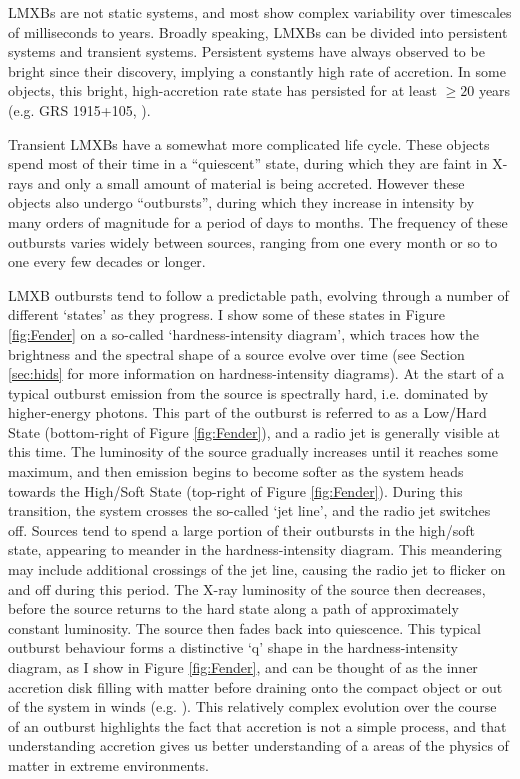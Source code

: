 \par LMXBs are not static systems, and most show complex variability over timescales of milliseconds to years.  Broadly speaking, LMXBs can be divided into persistent systems and transient systems.  Persistent systems have always observed to be bright since their discovery, implying a constantly high rate of accretion.  In some objects, this bright, high-accretion rate state has persisted for at least $\geq20$ years (e.g. GRS 1915+105, \citealp{Deegan_1915}).
\par Transient LMXBs have a somewhat more complicated life cycle.  These objects spend most of their time in a ``quiescent'' state, during which they are faint in X-rays and only a small amount of material is being accreted.  However these objects also undergo ``outbursts'', during which they increase in intensity by many orders of magnitude for a period of days to months.  The frequency of these outbursts varies widely between sources, ranging from one every month or so to one every few decades or longer.
\par LMXB outbursts tend to follow a predictable path, evolving through a number of different `states' as they progress.  I show some of these states in Figure \ref{fig:Fender} on a so-called `hardness-intensity diagram', which traces how the brightness and the spectral shape of a source evolve over time (see Section \ref{sec:hids} for more information on hardness-intensity diagrams).  At the start of a typical outburst emission from the source is spectrally hard, i.e. dominated by higher-energy photons.  This part of the outburst is referred to as a Low/Hard State (bottom-right of Figure \ref{fig:Fender}), and a radio jet is generally visible at this time.  The luminosity of the source gradually increases until it reaches some maximum, and then emission begins to become softer as the system heads towards the High/Soft State (top-right of Figure \ref{fig:Fender}).  During this transition, the system crosses the so-called `jet line', and the radio jet switches off.  Sources tend to spend a large portion of their outbursts in the high/soft state, appearing to meander in the hardness-intensity diagram.  This meandering may include additional crossings of the jet line, causing the radio jet to flicker on and off during this period.  The X-ray luminosity of the source then decreases, before the source returns to the hard state along a path of approximately constant luminosity.  The source then fades back into quiescence.  This typical outburst behaviour forms a distinctive `q' shape in the hardness-intensity diagram, as I show in Figure \ref{fig:Fender}, and can be thought of as the inner accretion disk filling with matter before draining onto the compact object or out of the system in winds (e.g. \citealp{Fender_UniJets}).  This relatively complex evolution over the course of an outburst highlights the fact that accretion is not a simple process, and that understanding accretion gives us better understanding of a areas of the physics of matter in extreme environments.

